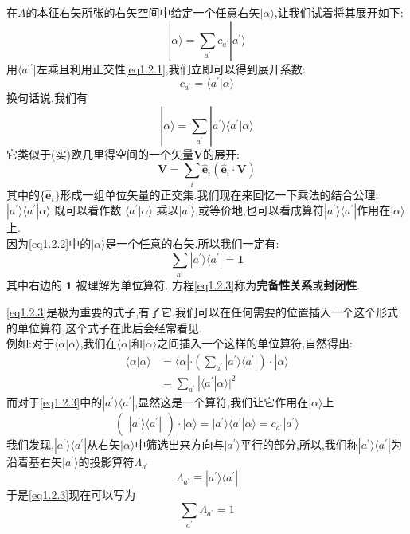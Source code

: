 在$A$的本征右矢所张的右矢空间中给定一个任意右矢$|\alpha\rangle$,让我们试着将其展开如下:
\begin{equation}
	|\alpha\rangle=\sum_{a^{\prime}}c_{a^{\prime}}|a^{\prime}\rangle
\end{equation}
用$\langle a^{\prime\prime}|$左乘且利用正交性\ref{eq1.2.1},我们立即可以得到展开系数:
$$c_{a^{\prime}}=\langle a^{\prime}|\alpha\rangle$$
换句话说,我们有
\begin{equation}\label{eq1.2.2}
	|\alpha\rangle=\sum_{a^{\prime}}|a^{\prime}\rangle\langle a^{\prime}|\alpha\rangle
\end{equation}
它类似于(实)欧几里得空间的一个矢量$\mathbf{V}$的展开:
$$\mathbf{V}=\sum_i\hat{\mathbf{e}}_i(\hat{\mathbf{e}}_i\cdot\mathbf{V})$$
其中的$\{\hat{\mathbf{e}}_i\}$形成一组单位矢量的正交集.我们现在来回忆一下乘法的结合公理:$|a^\prime\rangle\langle a^{\prime}|\alpha\rangle$ 既可以看作数 $\langle a^\prime|\alpha\rangle$ 乘以$|a^\prime\rangle$,或等价地,也可以看成算符$|a^\prime\rangle\langle a^\prime|$作用在$|\alpha\rangle$上.\\
因为\ref{eq1.2.2}中的$|\alpha\rangle$是一个任意的右矢.所以我们一定有:
\begin{equation}\label{eq1.2.3}
	\sum_{a^{\prime}}|a^{\prime}\rangle\langle a^{\prime}|=\mathbf{1}
\end{equation}
其中右边的 $\mathbf{1}$ 被理解为单位算符. 方程\ref{eq1.2.3}称为\textbf{完备性关系}或\textbf{封闭性}.

\ref{eq1.2.3}是极为重要的式子,有了它,我们可以在任何需要的位置插入一个这个形式的单位算符,这个式子在此后会经常看见.\\
例如:对于$\langle\alpha|\alpha\rangle$,我们在$\langle\alpha|$和$|\alpha\rangle$之间插入一个这样的单位算符,自然得出:
\begin{equation}
	\begin{aligned}
		\langle\alpha|\alpha\rangle&=\langle\alpha|\cdot(\sum_{a^{\prime}}|a^{\prime}\rangle\langle a^{\prime}|)\cdot|\alpha\rangle\\&=\sum_{a^{\prime}}|\langle a^{\prime}|\alpha\rangle|^2
	\end{aligned}
\end{equation}
而对于\ref{eq1.2.3}中的$|a^{\prime}\rangle\langle a^{\prime}|$,显然这是一个算符,我们让它作用在$|\alpha\rangle$上
\begin{equation}
	(\begin{array}{c}|a^{\prime}\rangle\langle a^{\prime}|\end{array})\cdot|\alpha\rangle=|a^{\prime}\rangle\langle a^{\prime}|\alpha\rangle=c_{a^{\prime}}|a^{\prime}\rangle 
\end{equation}
我们发现,$|a^{\prime}\rangle\langle a^{\prime}|$从右矢$|\alpha\rangle$中筛选出来方向与$|a^{'}\rangle$平行的部分,所以,我们称$|a^{\prime}\rangle\langle a^{\prime}|$为沿着基右矢$|a^{'}\rangle$的投影算符$\Lambda_{a^{\prime}}$\
\begin{equation}
	\Lambda_{a^{\prime}}\equiv| a^{\prime}\rangle\langle a^{\prime}| 
\end{equation}
于是\ref{eq1.2.3}现在可以写为
\begin{equation}
	\sum_{a^{\prime}}\Lambda_{a^{\prime}}=1
\end{equation}
